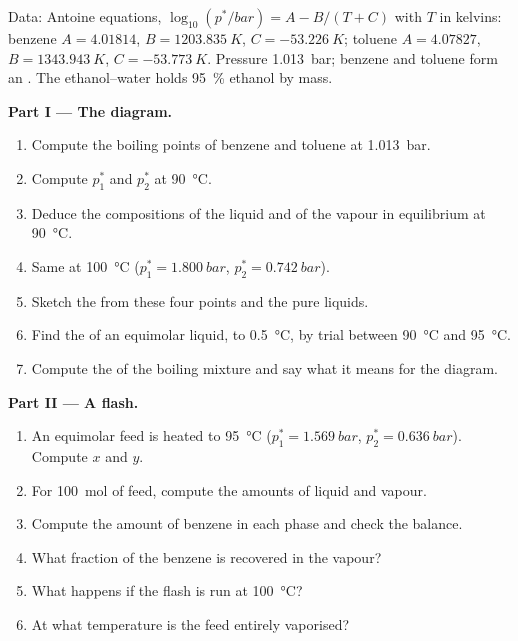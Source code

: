 \begin{problem}
\label{pb:b2:liquid-vapour-diagrams:1}
Data: Antoine equations, $\log_{10}(p^*/\unit{bar}) = A - B/(T + C)$ with $T$ in
kelvins: benzene $A = 4.01814$, $B = \qty{1203.835}{K}$, $C =
\qty{-53.226}{K}$; toluene $A = 4.07827$, $B = \qty{1343.943}{K}$, $C =
\qty{-53.773}{K}$. Pressure \qty{1.013}{bar}; benzene and toluene form an . The ethanol--water  holds 95~\% ethanol by mass.

\medskip
\noindent\textbf{Part I --- The diagram.}
\begin{enumerate}
  \item Compute the boiling points of benzene and toluene at \qty{1.013}{bar}.
  \item Compute $p_1^*$ and $p_2^*$ at \qty{90}{\degreeCelsius}.
  \item Deduce the compositions of the liquid and of the vapour in equilibrium
        at \qty{90}{\degreeCelsius}.
  \item Same at \qty{100}{\degreeCelsius} ($p_1^* = \qty{1.800}{bar}$, $p_2^* =
        \qty{0.742}{bar}$).
  \item Sketch the  from these four points and the pure liquids.
  \item Find the  of an equimolar liquid, to
        \qty{0.5}{\degreeCelsius}, by trial between \qty{90}{\degreeCelsius} and
        \qty{95}{\degreeCelsius}.
  \item Compute the  of the boiling mixture and say what it means for
        the diagram.
\end{enumerate}

\medskip
\noindent\textbf{Part II --- A flash.}
\begin{enumerate}[resume]
  \item An equimolar feed is heated to \qty{95}{\degreeCelsius} ($p_1^* =
        \qty{1.569}{bar}$, $p_2^* = \qty{0.636}{bar}$). Compute $x$ and $y$.
  \item For \qty{100}{mol} of feed, compute the amounts of liquid and vapour.
  \item Compute the amount of benzene in each phase and check the balance.
  \item What fraction of the benzene is recovered in the vapour?
  \item What happens if the flash is run at \qty{100}{\degreeCelsius}?
  \item At what temperature is the feed entirely vaporised?
\end{enumerate}


\end{problem}
